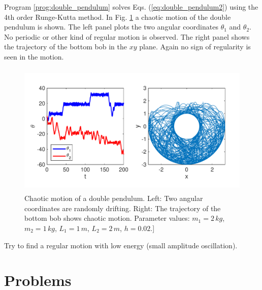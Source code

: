Program \ref{prog:double_pendulum} solves Eqs. (\ref{eq:double_pendulum2}) using the 4th order Runge-Kutta method.
In Fig. \ref{fig:double_pendulum} a chaotic motion of the double pendulum is shown. The left panel plots the two angular coordinates $\theta_1$ and $\theta_2$.  No periodic or other kind of regular motion is observed. The right panel shows the trajectory of the bottom bob in the $xy$ plane.  Again no sign of regularity is seen in the motion.

\begin{figure}
\center
\includegraphics[height=2.5in]{05.ode1/double_pendulum.pdf}
\caption{Chaotic motion of a double pendulum.  Left: Two angular coordinates are randomly drifting.  Right: The trajectory of the bottom bob shows chaotic motion.  Parameter values: $m_1=2\, kg$, $m_2=1\, kg$, $L_1=1\, m$, $L_2=2\, m$, $h=0.02$.]}
\label{fig:double_pendulum}
\end{figure}

\bigskip
\exercise Try to find a regular motion with low energy (small amplitude oscillation).  


\newpage
\section{Problems}

